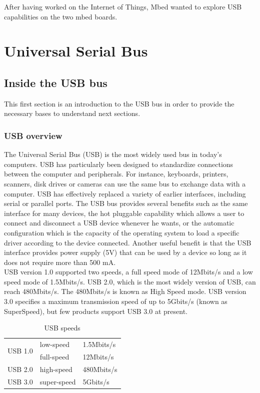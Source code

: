 \documentclass[pdftex,10pt,a4paper]{report}
\begin{document}
After having worked on the Internet of Things, Mbed wanted to explore USB capabilities on the two mbed boards.
	
	
	
	
	
	
	
	
	
	

\chapter{Universal Serial Bus}

\section{Inside the USB bus}
This first section is an introduction to the USB bus in order to provide the necessary bases to understand next sections.

\subsection{USB overview}
The Universal Serial Bus (USB) is the most widely used bus in today's computers. USB has particularly been designed to standardize connections between the computer and peripherals. For instance, keyboards, printers, scanners, disk drives or cameras can use the same bus to exchange data with a computer. USB has effectively replaced a variety of earlier interfaces, including serial or parallel ports. The USB bus provides several benefits such as the same interface for many devices, the hot pluggable capability which allows a user to connect and disconnect a USB device whenever he wants, or the automatic configuration which is the capacity of the operating system to load a specific driver according to the device connected. Another useful benefit is that the USB interface provides power supply (5V) that can be used by a device so long as it does not require more than 500 mA.\\

USB version 1.0 supported two speeds, a full speed mode of 12Mbits/s and a low speed mode of 1.5Mbits/s. USB 2.0, which is the most widely version of USB, can reach 480Mbits/s. The 480Mbits/s is known as High Speed mode. USB version 3.0 specifies a maximum transmission speed of up to 5Gbits/s (known as SuperSpeed), but few products support USB 3.0 at present.
\\
\begin{table}[h!]
\begin{center}
\begin{tabular}{|l|l|l|}
\hline
\multirow{2}{*}{USB 1.0} & low-speed & 1.5Mbits/s \\
 & full-speed & 12Mbits/s \\ \hline
USB 2.0 & high-speed & 480Mbits/s \\ \hline
USB 3.0 & super-speed & 5Gbits/s \\ \hline
\end{tabular}
\end{center}
\caption{USB speeds}
\label{USB speeds}
\end{table}
\end{document}
